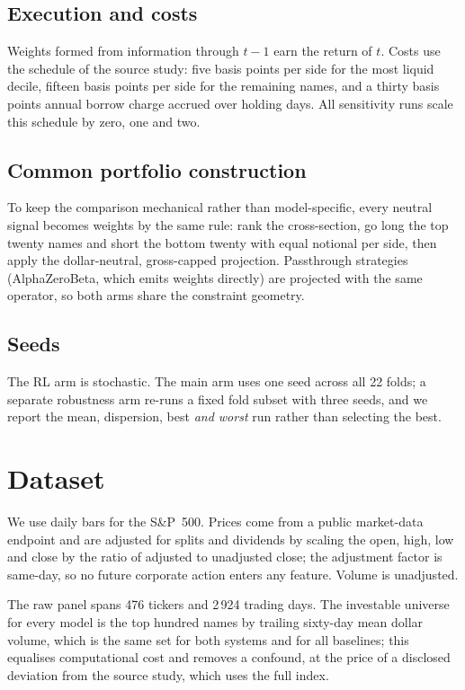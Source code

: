 \documentclass[conference]{IEEEtran}
\newcommand{\tabdir}{tables}
\begin{document}
\subsection{Execution and costs}
Weights formed from information through $t-1$ earn the return of $t$. Costs use
the schedule of the source study: five basis points per side for the most
liquid decile, fifteen basis points per side for the remaining names, and a
thirty basis points annual borrow charge accrued over holding days. All
sensitivity runs scale this schedule by zero, one and two.

\subsection{Common portfolio construction}
To keep the comparison mechanical rather than model-specific, every neutral
signal becomes weights by the same rule: rank the cross-section, go long the
top twenty names and short the bottom twenty with equal notional per side, then
apply the dollar-neutral, gross-capped projection. Passthrough strategies
(AlphaZeroBeta, which emits weights directly) are projected with the same
operator, so both arms share the constraint geometry.

\subsection{Seeds}
The RL arm is stochastic. The main arm uses one seed across all 22 folds; a
separate robustness arm re-runs a fixed fold subset with three seeds, and we
report the mean, dispersion, best \emph{and worst} run rather than selecting
the best.

\section{Dataset}
\label{sec:data}


We use daily bars for the S\&P~500. Prices come from a public market-data
endpoint and are adjusted for splits and dividends by scaling the open, high,
low and close by the ratio of adjusted to unadjusted close; the adjustment
factor is same-day, so no future corporate action enters any feature. Volume is
unadjusted.

The raw panel spans 476 tickers and 2\,924 trading days. The investable
universe for every model is the top hundred names by trailing sixty-day mean
dollar volume, which is the same set for both systems and for all baselines;
this equalises computational cost and removes a confound, at the price of a
disclosed deviation from the source study, which uses the full index.
\end{document}
